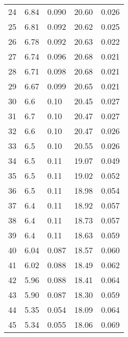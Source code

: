 \begin{table}
\begin{tabular}{c|ll|ll}
24 & 6.84 & 0.090 & 20.60 & 0.026 \\
25 & 6.81 & 0.092 & 20.62 & 0.025 \\
26 & 6.78 & 0.092 & 20.63 & 0.022 \\
27 & 6.74 & 0.096 & 20.68 & 0.021 \\
28 & 6.71 & 0.098 & 20.68 & 0.021 \\
29 & 6.67 & 0.099 & 20.65 & 0.021 \\
30 & 6.6 & 0.10 & 20.45 & 0.027 \\
31 & 6.7 & 0.10 & 20.47 & 0.027 \\
32 & 6.6 & 0.10 & 20.47 & 0.026 \\
33 & 6.5 & 0.10 & 20.55 & 0.026 \\
34 & 6.5 & 0.11 & 19.07 & 0.049 \\
35 & 6.5 & 0.11 & 19.02 & 0.052 \\
36 & 6.5 & 0.11 & 18.98 & 0.054 \\
37 & 6.4 & 0.11 & 18.92 & 0.057 \\
38 & 6.4 & 0.11 & 18.73 & 0.057 \\
39 & 6.4 & 0.11 & 18.63 & 0.059 \\
40 & 6.04 & 0.087 & 18.57 & 0.060 \\
41 & 6.02 & 0.088 & 18.49 & 0.062 \\
42 & 5.96 & 0.088 & 18.41 & 0.064 \\
43 & 5.90 & 0.087 & 18.30 & 0.059 \\
44 & 5.35 & 0.054 & 18.09 & 0.064 \\
45 & 5.34 & 0.055 & 18.06 & 0.069 \\
               \hline
        \end{tabular}
    \end{table}
    \clearpage

